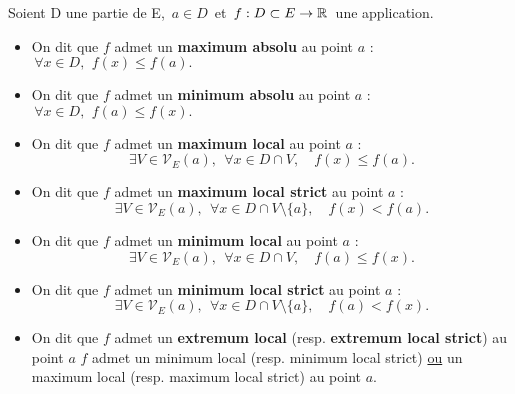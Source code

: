 \vspace{1cm}

Soient D une partie de E, \(\,a\in D\,\) et \(\, f:D\subset E\to \mathbb{R}\,\) une application.
\begin{itemize}[leftmargin=0.5cm, label=•]
    \item On dit que $f$ admet un \textbf{maximum absolu} au point $a$ \ssi : \(\, \forall x\in D,\ \, f(x)\leq f(a).\)\vspace{0.2cm}
    
    \item On dit que $f$ admet un \textbf{minimum absolu} au point $a$ \ssi : \(\, \forall x\in D,\ \, f(a)\leq f(x).\)\vspace{0.2cm}
    
    \item On dit que $f$ admet un \textbf{maximum local} au point $a$ \ssi :\vspace{-0.3cm}\\
    \[\exists V\!\in \mathcal{V}_E(a),\ \  \forall x\in D\cap V,\quad f(x)\leq f(a).\]\vspace{-0.4cm}

    \item On dit que $f$ admet un \textbf{maximum local strict} au point $a$ \ssi :\vspace{-0.3cm}\\
    \[\exists V\!\in \mathcal{V}_E(a),\ \  \forall x\in D\cap V\setminus\!\{a\},\quad f(x)< f(a).\]\vspace{-0.4cm}

    \item On dit que $f$ admet un \textbf{minimum local} au point $a$ \ssi :\vspace{-0.3cm}\\
    \[\exists V\!\in \mathcal{V}_E(a),\ \  \forall x\in D\cap V,\quad f(a)\leq f(x).\]\vspace{-0.4cm}

    \item On dit que $f$ admet un \textbf{minimum local strict} au point $a$ \ssi :\vspace{-0.3cm}\\
    \[\exists V\!\in \mathcal{V}_E(a),\ \  \forall x\in D\cap V\setminus\!\{a\},\quad f(a)< f(x).\]\vspace{-0.3cm}

    \item On dit que $f$ admet un \textbf{extremum local} (resp. \textbf{extremum local strict}) au point $a$ \ssi $f$ admet un minimum local (resp. minimum local strict) \underline{ou} un maximum local (resp. maximum local strict) au point $a$.
\end{itemize}


